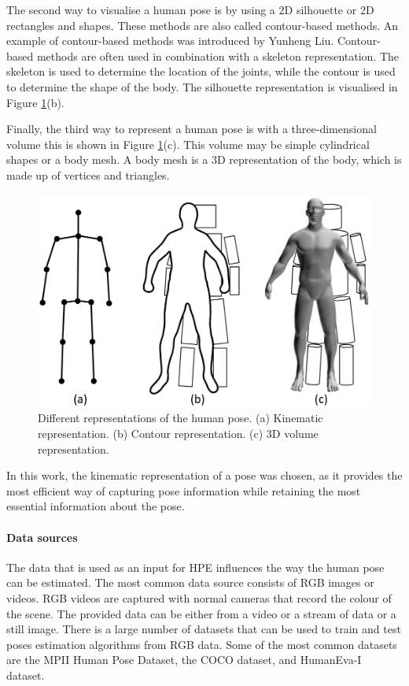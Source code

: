 The second way to visualise a human pose is by using a 2D silhouette or 2D rectangles and shapes. These methods are also called contour-based methods. An example of contour-based methods was introduced by Yunheng Liu\cite{contourHPE}. Contour-based methods are often used in combination with a skeleton representation. The skeleton is used to determine the location of the joints, while the contour is used to determine the shape of the body. The silhouette representation is visualised in Figure \ref{fig:pose_representation}(b).

Finally, the third way to represent a human pose is with a three-dimensional volume this is shown in Figure \ref{fig:pose_representation}(c). This volume may be simple cylindrical shapes or a body mesh. A body mesh is a 3D representation of the body, which is made up of vertices and triangles.

\begin{figure}[ht]
    \centering
    \includegraphics[width=0.6\linewidth]{figures/HPE/PoseRepresentation.png}
    \caption[Different representations of the human pose]{Different representations of the human pose. (a) Kinematic representation. (b) Contour representation. (c) 3D volume representation. \cite{HPESurveyOriginal}}
    \label{fig:pose_representation}
\end{figure}

In this work, the kinematic representation of a pose was chosen, as it provides the most efficient way of capturing pose information while retaining the most essential information about the pose. 

\paragraph{Data sources}

The data that is used as an input for HPE influences the way the human pose can be estimated. The most common data source consists of  RGB images or videos. RGB videos are captured with normal cameras that record the colour of the scene. The provided data can be either from a video or a stream of data or a still image. There is a large number of datasets that can be used to train and test poses estimation algorithms from RGB data. Some of the most common datasets are the MPII Human Pose Dataset\cite{MPII}, the COCO dataset\cite{Coco}, and HumanEva-I dataset\cite{HumanEva}.


